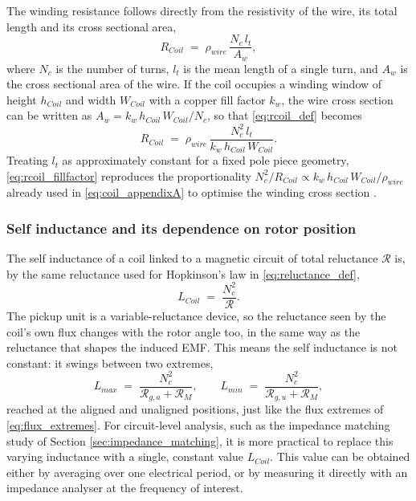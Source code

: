 The winding resistance follows directly from the resistivity of the wire, its total length and its cross sectional area,
\begin{equation}
    R_{Coil} \;=\; \rho_{wire}\,\frac{N_c\, l_t}{A_w},
    \label{eq:rcoil_def}
\end{equation}
where $N_c$ is the number of turns, $l_t$ is the mean length of a single turn, and $A_w$ is the cross sectional area of the wire. If the coil occupies a winding window of height $h_{Coil}$ and width $W_{Coil}$ with a copper fill factor $k_w$, the wire cross section can be written as $A_w = k_w\, h_{Coil}\, W_{Coil} / N_c$, so that \eqref{eq:rcoil_def} becomes
\begin{equation}
    R_{Coil} \;=\; \rho_{wire}\,\frac{N_c^2\, l_t}{k_w\, h_{Coil}\, W_{Coil}}.
    \label{eq:rcoil_fillfactor}
\end{equation}
Treating $l_t$ as approximately constant for a fixed pole piece geometry, \eqref{eq:rcoil_fillfactor} reproduces the proportionality $N_c^2 / R_{Coil} \propto k_w\, h_{Coil}\, W_{Coil} / \rho_{wire}$ already used in \eqref{eq:coil_appendixA} to optimise the winding cross section \cite{xuDesignModelingOptimization2019a}.

\subsubsection*{Self inductance and its dependence on rotor position}

The self inductance of a coil linked to a magnetic circuit of total reluctance $\mathcal{R}$ is, by the same reluctance used for Hopkinson's law in \eqref{eq:reluctance_def},
\begin{equation}
    L_{Coil} \;=\; \frac{N_c^2}{\mathcal{R}}.
    \label{eq:lcoil_def}
\end{equation}
The pickup unit is a variable-reluctance device, so the reluctance seen by the coil's own flux changes with the rotor angle too, in the same way as the reluctance that shapes the induced EMF. This means the self inductance is not constant: it swings between two extremes,
\begin{equation}
    L_{max} \;=\; \frac{N_c^2}{\mathcal{R}_{g,a}+\mathcal{R}_M}, \qquad
    L_{min} \;=\; \frac{N_c^2}{\mathcal{R}_{g,u}+\mathcal{R}_M},
    \label{eq:lcoil_extremes}
\end{equation}
reached at the aligned and unaligned positions, just like the flux extremes of \eqref{eq:flux_extremes}. For circuit-level analysis, such as the impedance matching study of Section \ref{sec:impedance_matching}, it is more practical to replace this varying inductance with a single, constant value $L_{Coil}$. This value can be obtained either by averaging over one electrical period, or by measuring it directly with an impedance analyser at the frequency of interest.

